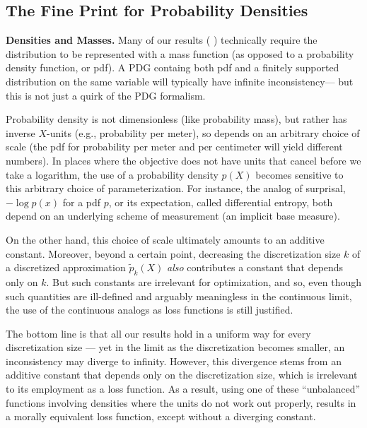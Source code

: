 \clearpage
\begin{subappendices}

\section{The Fine Print for Probability Densities}
\label{appendix:density}
\textbf{Densities and Masses.} Many of our results (%
)
technically require the distribution to be represented with a mass function (as opposed to a probability density function, or pdf).
A PDG containg both pdf and a finitely supported distribution on the same variable
will typically have infinite inconsistency---%
but this is not just a quirk of the PDG formalism.


Probability density is not dimensionless (like probability mass), but rather has inverse $X$-units (e.g., probability per meter), so depends on an arbitrary choice of scale (the pdf for probability per meter and per centimeter will yield different numbers).
In places where the objective does not have units that cancel before we take a logarithm,
the use of a probability density $p(X)$ becomes sensitive to this arbitrary choice of parameterization. For instance, the analog of surprisal, $- \log p(x)$ for a pdf $p$, or its expectation, called differential entropy, both depend on an underlying scheme of measurement (an implicit base measure).

On the other hand, this choice of scale ultimately amounts to an additive constant.
Moreover, beyond a certain point, decreasing the discretization size $k$ of a discretized approximation $\tilde p_k(X)$ \emph{also} contributes a constant that depends only on $k$.
But such constants are irrelevant for optimization, and so, even though such quantities are ill-defined and arguably meaningless in the continuous limit, the use of the continuous analogs as loss functions is still justified.


The bottom line is that all our results hold in a uniform way for every discretization size --- yet in the limit as the discretization becomes smaller, an inconsistency may diverge to infinity.
However, this divergence stems from an additive constant that depends only on the discretization size, which is irrelevant to its employment as a loss function.
As a result, using one of these ``unbalanced'' functions involving densities where the units do not work out properly, results in a morally equivalent loss function, except without a diverging constant.


\end{subappendices}
